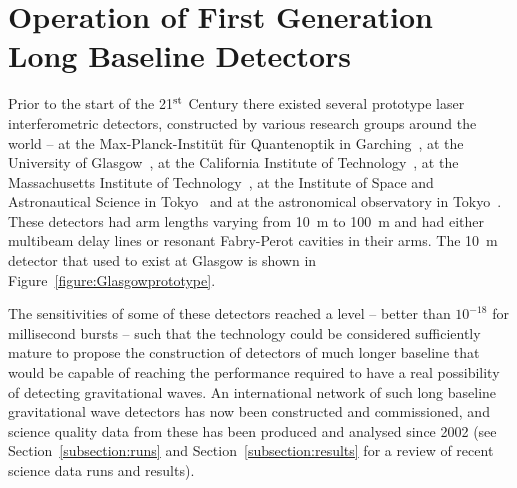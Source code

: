 \documentclass{article}
\begin{document}
\newpage

\section{Operation of First Generation Long Baseline Detectors}
\label{section:construction}

Prior to the start of the 21$^{\rm st}$ Century there existed several prototype
laser interferometric detectors, constructed by various research groups around
the world -- at the Max-Planck-Instit\"ut f\"ur Quantenoptik in
Garching~\cite{Shoemaker}, at the University of Glasgow~\cite{Robertson}, at the
California Institute of Technology~\cite{Abramovici}, at the Massachusetts
Institute of Technology~\cite{Fritschel2}, at the Institute of Space and
Astronautical Science in Tokyo~\cite{Mizuno} and at the astronomical observatory
in Tokyo~\cite{Araya}. These detectors had arm lengths varying from 10~m to
100~m and had either multibeam delay lines or resonant Fabry-Perot cavities in
their arms.  The 10~m detector that used to exist at Glasgow is shown in
Figure~\ref{figure:Glasgowprototype}.


The sensitivities of some of these detectors reached a level -- better than
$10^{-18}$ for millisecond bursts -- such that the technology could be
considered sufficiently mature to propose the construction of detectors of much
longer baseline that would be capable of reaching the performance required to
have a real possibility of detecting gravitational waves.  An international
network of such long baseline gravitational wave detectors has now been
constructed and commissioned, and science quality data from these has been
produced and analysed since 2002 (see Section~\ref{subsection:runs} and
Section~\ref{subsection:results} for a review of recent science data runs and
results).
\end{document}
